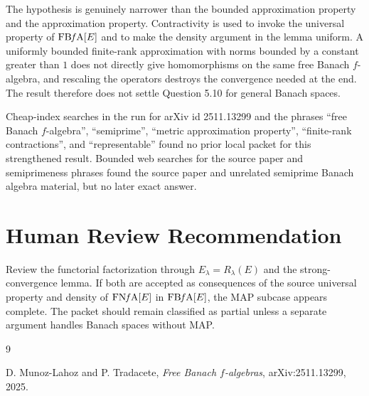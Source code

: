 \documentclass[11pt]{article}
\newcommand{\FBFA}[1]{\operatorname{FB{\it f}A}[#1]}
\newcommand{\FNFA}[1]{\operatorname{FN{\it f}A}[#1]}
\begin{document}
The hypothesis is genuinely narrower than the bounded approximation
property and the approximation property.  Contractivity is used to invoke
the universal property of \(\FBFA{E}\) and to make the density argument in
the lemma uniform.  A uniformly bounded finite-rank approximation with
norms bounded by a constant greater than \(1\) does not directly give
homomorphisms on the same free Banach \(f\)-algebra, and rescaling the
operators destroys the convergence needed at the end.  The result
therefore does not settle Question 5.10 for general Banach spaces.

Cheap-index searches in the run for arXiv id 2511.13299 and the phrases
``free Banach \(f\)-algebra'', ``semiprime'', ``metric approximation
property'', ``finite-rank contractions'', and ``representable'' found no
prior local packet for this strengthened result.  Bounded web searches
for the source paper and semiprimeness phrases found the source paper and
unrelated semiprime Banach algebra material, but no later exact answer.

\section*{Human Review Recommendation}

Review the functorial factorization through \(E_\lambda=R_\lambda(E)\)
and the strong-convergence lemma.  If both are accepted as consequences
of the source universal property and density of \(\FNFA{E}\) in
\(\FBFA{E}\), the MAP subcase appears complete.  The packet should remain
classified as partial unless a separate argument handles Banach spaces
without MAP.

\begin{thebibliography}{9}

D. Munoz-Lahoz and P. Tradacete,
\emph{Free Banach \(f\)-algebras},
arXiv:2511.13299, 2025.

\end{thebibliography}
\end{document}
